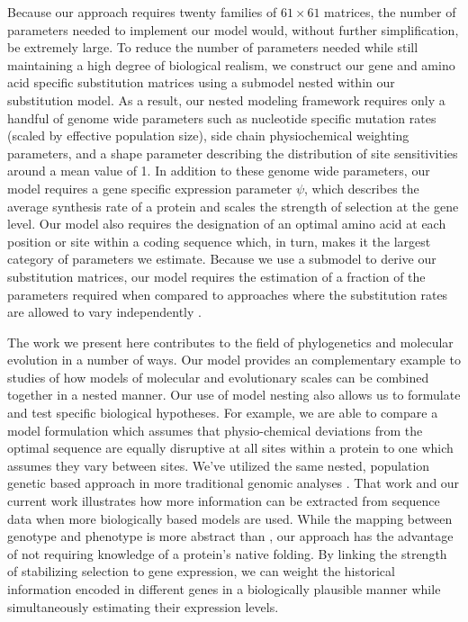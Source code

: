 \documentclass{article}
\begin{document}
Because our approach requires twenty families of $61 \times 61$ matrices, the number of parameters needed to implement our model would, without further simplification, be extremely large.
To reduce the number of parameters needed while still maintaining a high degree of biological realism, we construct our gene and amino acid specific substitution matrices using a submodel nested within our substitution model.
As a result, our nested modeling framework requires only a handful of genome wide parameters such as nucleotide specific mutation rates (scaled by effective population size), side chain physiochemical weighting parameters, and a shape parameter describing the distribution of site sensitivities around a mean value of 1.
In addition to these genome wide parameters, our model requires a gene specific expression parameter $\psi$, which describes the average synthesis rate of a protein and scales the strength of selection at the gene level.
Our model also requires the designation of an optimal amino acid at each position or site within a coding sequence which, in turn, makes it the largest category of parameters we estimate.
Because we use a submodel to derive our substitution matrices, our model requires the estimation of a fraction of the parameters required when compared to approaches where the substitution rates are allowed to vary independently  \citep{HalpernAndBruno1998,LartillotAndPhilippe2004,RodrigueAndLartillot2014}.


The work we present here contributes to the field of phylogenetics and molecular evolution in a number of ways.
Our model provides an complementary example to \citet{ThorneEtAl2012} studies of how models of molecular and evolutionary scales can be combined together in a nested manner.
Our use of model nesting also allows us to formulate and test specific biological hypotheses.
For example, we are able to compare a model formulation which assumes that physio-chemical deviations from the optimal sequence are equally disruptive at all sites within a protein to one which assumes they vary between sites.
We've utilized the same nested, population genetic based approach in more traditional genomic analyses \citep[e.g.][]{Gilchrist2007,ShahAndGilchrist2011,GilchristEtAl2015}.
That work and our current work illustrates how more information can be extracted from sequence data when more biologically based models are used.
While the mapping between genotype and phenotype is more abstract than \citet{ThorneEtAl2012}, our approach has the advantage of not requiring knowledge of a protein's native folding.
By linking the strength of stabilizing selection to gene expression,  we can weight the historical information encoded in different genes in a biologically plausible manner while simultaneously estimating their expression levels.
\end{document}
